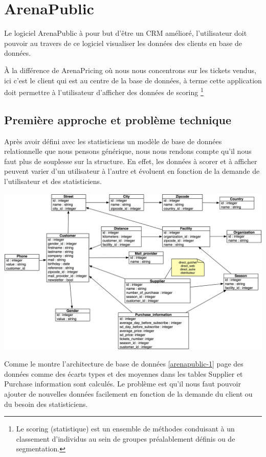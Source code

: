 \section{ArenaPublic}
Le logiciel ArenaPublic à pour but d'être un CRM amélioré, l'utilisateur doit pouvoir au travers de ce logiciel visualiser les données des clients en base de données. 

À la différence de ArenaPricing où nous nous concentrons sur les tickets vendus, ici c'est le client qui est au centre de la base de données, à terme cette application doit permettre à l'utilisateur d'afficher des données de scoring \footnote{Le scoring (statistique) est un ensemble de méthodes conduisant à un classement d'individus au sein de groupes préalablement définis ou de segmentation.}


\subsection{Première approche et problème technique}
Après avoir défini avec les statisticiens un modèle de base de données relationnelle que nous pensons générique, nous nous rendons compte qu'il nous faut plus de souplesse sur la structure. En effet, les données à scorer et à afficher peuvent varier d'un utilisateur à l'autre et évoluent en fonction de la demande de l'utilisateur et des statisticiens.

\begin{center}
\includegraphics[scale=0.2]{images/arenapublic-1.jpg}
\label{arenapublic-1}
\end{center}


Comme le montre l'architecture de base de données \ref{arenapublic-1} page \pageref{arenapublic-1} des données comme des écarts types et des moyennes dans les tables Supplier et Purchase information sont calculés. Le problème est qu'il nous faut pouvoir ajouter de nouvelles données facilement en fonction de la demande du client ou du besoin des statisticiens.

